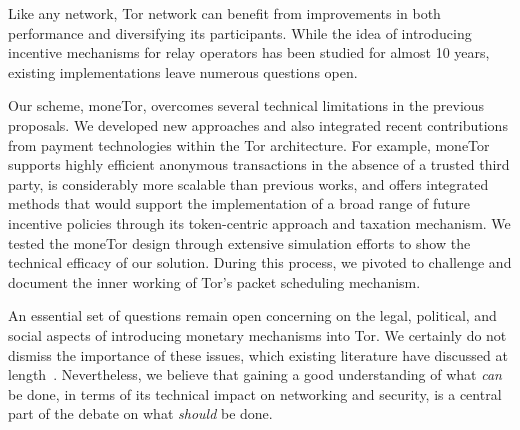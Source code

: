 Like any network, Tor network can benefit from improvements in both performance and diversifying its participants.
While the idea of introducing incentive mechanisms for relay operators has been studied for almost 10 years, existing implementations leave numerous questions open.

Our scheme, moneTor, overcomes several technical limitations in the previous proposals.
We developed new approaches and also integrated recent contributions from payment technologies within the Tor architecture.
For example, moneTor supports highly efficient anonymous transactions in the absence of a trusted third party, is considerably more scalable than previous works, and offers integrated methods that would support the implementation of a broad range of future incentive policies through its token-centric approach and taxation mechanism.
We tested the moneTor design through extensive simulation efforts to show the technical efficacy of our solution.
During this process, we pivoted to challenge and document the inner working of Tor's packet scheduling mechanism.

An essential set of questions remain open concerning on the legal, political, and social aspects of introducing monetary mechanisms into Tor.
We certainly do not dismiss the importance of these issues, which existing literature have discussed at length~\cite{jansenblogpost}.
Nevertheless, we believe that gaining a good understanding of what \emph{can} be done, in terms of its technical impact on networking and security, is a central part of the debate on what \emph{should} be done.

